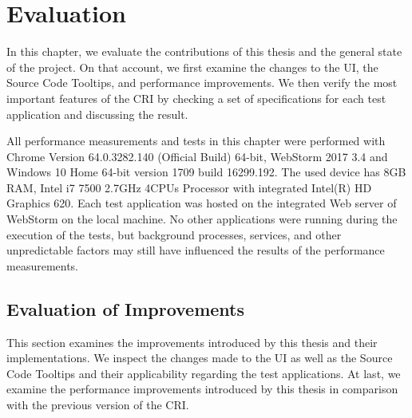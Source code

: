 \chapter{Evaluation}
\label{ch:Evaluation}
In this chapter, we evaluate the contributions of this thesis and the general state of the project. On that account, we first examine the changes to the UI, the Source Code Tooltips, and performance improvements. We then verify the most important features of the CRI by checking a set of specifications for each test application and discussing the result.

All performance measurements and tests in this chapter were performed with Chrome Version 64.0.3282.140 (Official Build) 64-bit, WebStorm 2017 3.4 and Windows 10 Home 64-bit version 1709 build 16299.192. The used device has 8GB RAM, Intel i7 7500 2.7GHz 4CPUs Processor with integrated Intel(R) HD Graphics 620. Each test application was hosted on the integrated Web server of WebStorm on the local machine. No other applications were running during the execution of the tests, but background processes, services, and other unpredictable factors may still have influenced the results of the performance measurements.

\section{Evaluation of Improvements}
This section examines the improvements introduced by this thesis and their implementations. We inspect the changes made to the UI as well as the Source Code Tooltips and their applicability regarding the test applications. At last, we examine the performance improvements introduced by this thesis in comparison with the previous version of the CRI.

